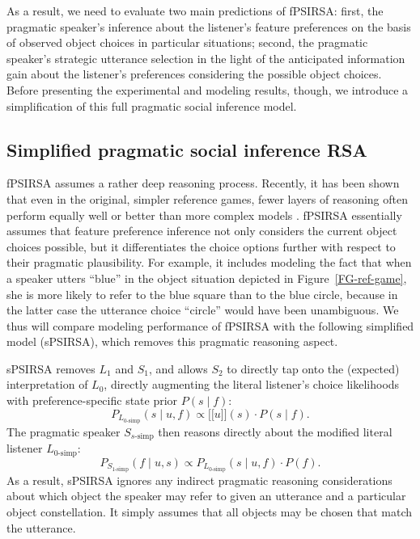 \documentclass[10pt,a4paper]{article}
\newcommand{\sem}[1]{\mbox{$[\![$#1$]\!]$}}
\begin{document}
As a result, we need to evaluate two main predictions of fPSIRSA: 
first, the pragmatic speaker's inference about the listener's feature preferences on the basis of observed object choices in particular situations; 
second, the pragmatic speaker's strategic utterance selection in the light of the anticipated information gain about the listener's preferences considering the possible object choices.
Before presenting the experimental and modeling results, though, we introduce a simplification of this full pragmatic social inference model. 


\subsection{Simplified pragmatic social inference RSA}
fPSIRSA assumes a rather deep reasoning process. 
Recently, it has been shown that even in the original, simpler reference games, fewer layers of reasoning often perform equally well or better than more complex models .
fPSIRSA essentially assumes that feature preference inference not only considers the current object choices possible, but it differentiates the choice options further with respect to their pragmatic plausibility. 
For example, it includes modeling the fact that when a speaker utters ``blue'' in the object situation depicted in Figure~\ref{FG-ref-game}, she is more likely to refer to the blue square than to the blue circle, because in the latter case the utterance choice ``circle'' would have been unambiguous. 
We thus will compare modeling performance of fPSIRSA with the following simplified model (sPSIRSA), which removes this pragmatic reasoning aspect.


sPSIRSA removes $L_1$ and $S_1$, and allows $S_2$ to directly tap onto the (expected) interpretation of $L_0$, directly augmenting the literal listener's choice likelihoods with preference-specific state prior $P(s\mid f)$:
$$P_{L_{0\textrm{-simp}}}(s\mid u,f) \propto \sem{$u$}(s) \cdot P(s\mid f).$$
The pragmatic speaker $S_{s\textrm{-simp}}$ then reasons directly about the modified literal listener $L_{0\textrm{-simp}}$: 
$$P_{S_{1\textrm{-simp}}}(f\mid u,s) \propto P_{L_{0\textrm{-simp}}}(s\mid u,f) \cdot P(f).$$
As a result, sPSIRSA ignores any indirect pragmatic reasoning considerations about which object the speaker may refer to given an utterance and a particular object constellation.
It simply assumes that all objects may be chosen that match the utterance.
\end{document}
